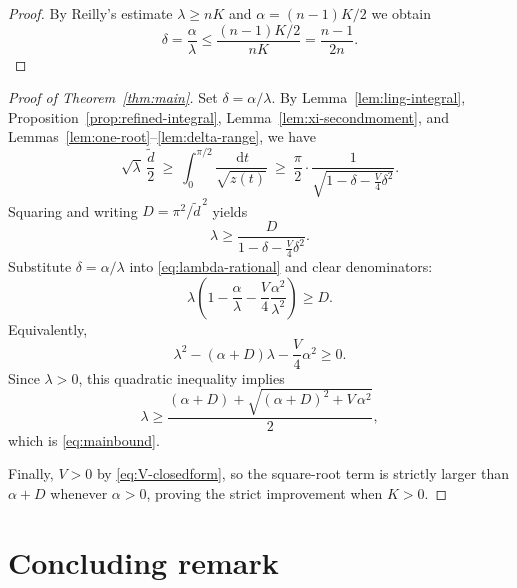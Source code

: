 \documentclass[11pt]{article}
\newcommand{\dd}{\,\mathrm{d}}
\newcommand{\de}{\tilde d}
\begin{document}
\begin{proof}
By Reilly's estimate $\lambda\ge nK$ and $\alpha=(n-1)K/2$ we obtain
\begin{equation}
\delta=\frac{\alpha}{\lambda}\le \frac{(n-1)K/2}{nK}=\frac{n-1}{2n}.
\end{equation}
\end{proof}

\begin{proof}[Proof of Theorem~\ref{thm:main}]
Set $\delta=\alpha/\lambda$.
By Lemma~\ref{lem:ling-integral}, Proposition~\ref{prop:refined-integral}, Lemma~\ref{lem:xi-secondmoment}, and Lemmas~\ref{lem:one-root}--\ref{lem:delta-range}, we have
\begin{equation}
\sqrt{\lambda}\,\frac{\de}{2}
\ \ge\
\int_{0}^{\pi/2}\frac{\dd t}{\sqrt{z(t)}}
\ \ge\
\frac{\pi}{2}\cdot\frac{1}{\sqrt{1-\delta-\frac{V}{4}\delta^2}}.
\end{equation}
Squaring and writing $D=\pi^2/\de^{\,2}$ yields
\begin{equation}
\label{eq:lambda-rational}
\lambda \ge \frac{D}{1-\delta-\frac{V}{4}\delta^2}.
\end{equation}
Substitute $\delta=\alpha/\lambda$ into \eqref{eq:lambda-rational} and clear denominators:
\begin{equation}
\lambda\left(1-\frac{\alpha}{\lambda}-\frac{V}{4}\frac{\alpha^2}{\lambda^2}\right)\ge D.
\end{equation}
Equivalently,
\begin{equation}
\lambda^2-(\alpha+D)\lambda-\frac{V}{4}\alpha^2\ge 0.
\end{equation}
Since $\lambda>0$, this quadratic inequality implies
\begin{equation}
\lambda\ge \frac{(\alpha+D)+\sqrt{(\alpha+D)^2+V\,\alpha^2}}{2},
\end{equation}
which is \eqref{eq:mainbound}.

Finally, $V>0$ by \eqref{eq:V-closedform}, so the square-root term is strictly larger than $\alpha+D$ whenever $\alpha>0$, proving the strict improvement when $K>0$.
\end{proof}


\section{Concluding remark}
\end{document}
